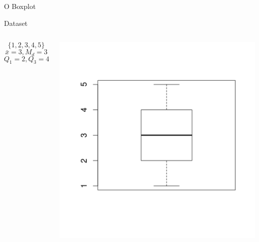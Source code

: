 \documentclass{beamer}
\begin{document}
\begin{frame}{O Boxplot}
  \begin{example}
    Dataset
    \begin{columns}
      \begin{column}{5cm}
        \begin{displaymath}
          \{1,2,3,4,5\}
        \end{displaymath}
        \begin{displaymath}
          \bar{x} = 3, M_d = 3
        \end{displaymath}
        \begin{displaymath}
          Q_1= 2, Q_3 = 4
        \end{displaymath}
      \end{column}
      \begin{column}{5cm}
        \includegraphics[height=0.6\textheight]{boxplot1}
      \end{column}
    \end{columns}
  \end{example}
\end{frame}
\end{document}
